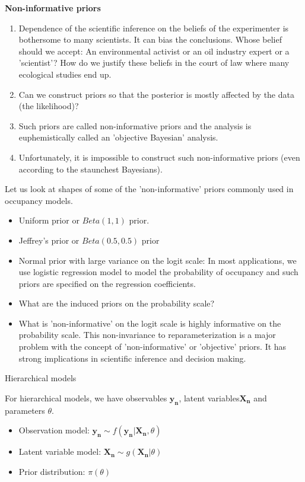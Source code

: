 \documentclass[10pt]{beamer}
\begin{document}
\begin{frame}
\begin{center} 
\LARGE \textbf {Non-informative priors}
\end{center}
\begin{enumerate}
\item Dependence of the scientific inference on the beliefs of the experimenter is bothersome to many scientists. It can bias the conclusions. Whose belief should we accept: An environmental activist or an oil industry expert or a 'scientist'? How do we justify these beliefs in the court of law where many ecological studies end up.
\pause
\item Can we construct priors so that the posterior is mostly affected by the data (the likelihood)?
\pause
\item Such priors are called non-informative priors and the analysis is euphemistically called an 'objective Bayesian' analysis.
\pause
\item Unfortunately, it is impossible to construct such non-informative priors (even according to the staunchest Bayesians). 
\pause
\end{enumerate}
\end{frame}

\begin{frame}
Let us look at shapes of some of the 'non-informative' priors commonly used in occupancy models. 
\begin{itemize}
\item Uniform prior or $Beta(1,1)$ prior.
\pause
\item Jeffrey's prior or $Beta(0.5,0.5)$ prior
\pause 
\item Normal prior with large variance on the logit scale: In most applications, we use logistic regression model to model the probability of occupancy and such priors are specified on the regression coefficients. 
\pause
\item What are the induced priors on the probability scale? 
\pause
\item What is 'non-informative' on the logit scale is highly informative on the probability scale. This non-invariance to reparameterization is a major problem with the concept of 'non-informative' or 'objective' priors. It has strong implications in scientific inference and decision making. 
\end{itemize}
\end{frame}

\begin{frame}
\begin{center}
\LARGE Hierarchical models
\end{center}
For hierarchical models, we have observables $\mathbf{y_n}$, latent variables$\mathbf{X_n}$ and parameters $\theta$. 
\begin{itemize}
\item Observation model: $\mathbf{y_n} \sim f(\mathbf{y_n}|\mathbf{X_n},\theta)$
\item Latent variable model: $\mathbf{X_n} \sim g(\mathbf{X_n}|\theta)$
\item Prior distribution: $\pi(\theta)$
\end{itemize}
\end{frame}
\end{document}
